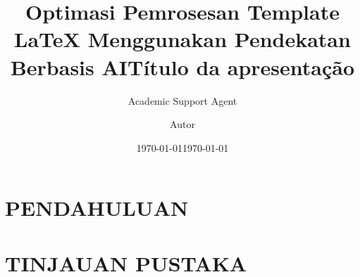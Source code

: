\documentclass{beamer}
\title{Optimasi Pemrosesan Template LaTeX Menggunakan Pendekatan Berbasis AI}
\author{Academic Support Agent}
\date{\today}
\begin{document}
\maketitle

\begin{abstract}

\end{abstract}

\chapter{PENDAHULUAN}


\chapter{TINJAUAN PUSTAKA}


\usepackage[utf8]{inputenc}

\usepackage[brazil]{babel}

\usepackage{amsmath}
\usepackage{amsfonts}
\usepackage{amssymb}
\usepackage{graphicx}
\DeclareMathOperator {\argmin}{argmin}

\author{Autor}
\title{Título da apresentação}
\newcommand{\email}{email}
\date{\today} 



%


\end{document}
